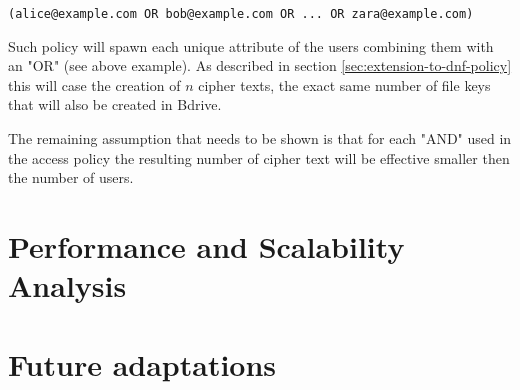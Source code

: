 \begin{center}
\begin{lstlisting}[caption={Worst case access policy. The used email address is a unique attribute per user.},captionpos=b]
(alice@example.com OR bob@example.com OR ... OR zara@example.com)
\end{lstlisting}
\end{center}

Such policy will spawn each unique attribute of the users combining them with an "OR" (see above example). As described in section \ref{sec:extension-to-dnf-policy} this will case the creation of $n$ cipher texts, the exact same number of file keys that will also be created in Bdrive. 

The remaining assumption that needs to be shown is that for each "AND" used in the access policy the resulting number of cipher text will be effective smaller then the number of users. 

\section{Performance and Scalability Analysis}



\section{Future adaptations}

